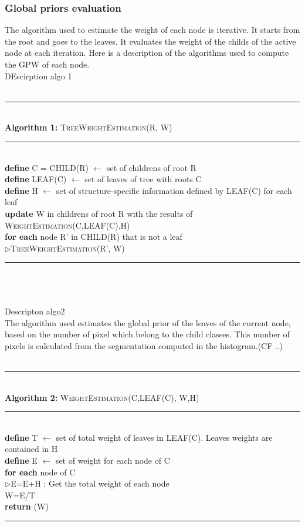 \subsubsection{Global priors evaluation}
The algorithm used to estimate the weight of each node is iterative. It starts from the root and goes to the leaves. It evaluates the weight of the childs of the active node at each iteration. Here is a description of the algorithms used to compute the GPW of each node.\\
DEscirption algo 1\\\\
%
%
\begin{minipage}{1\textwidth}
%
\hrule
\textbf{\\Algorithm 1:} \textsc{TreeWeightEstimation}(R, W)
\hrule
\textbf{\\define}  C = CHILD(R) $\leftarrow$ set of childrens of root R\\ 
\textbf{define}  LEAF(C)      $\leftarrow$ set of leaves of tree with roots C\\ 
\textbf{define}  H            $\leftarrow$ set of structure-specific information defined by LEAF(C) for each leaf\\
%
\textbf{update} W in childrens of root R with the results of \textsc{WeightEstimation}(C,LEAF(C),H)\\
%
\textbf{for each} node R' in CHILD(R) that is not a leaf\\
%
$\triangleright$\textsc{TreeWeightEstimation}(R', W)\\
\hrule
%
\end{minipage}
%
\\\\\\Descripton algo2\\
The algorithm used estimates the global prior of the leaves of the current node, based on the number of pixel which belong to the child classes.
This number of pixels is calculated from the segmentation computed in the histogram.(CF ..)\\\\
%
\begin{minipage}{1\textwidth}
%
\hrule
\textbf{\\Algorithm 2:} \textsc{WeightEstimation}(C,LEAF(C), W,H)
\hrule
\textbf{\\define}  T $\leftarrow$ set of total weight of leaves in LEAF(C). Leaves weights are contained in H\\ 
\textbf{define}  E      $\leftarrow$ set of weight for each node of C\\ 
\textbf{for each}  node of C\\
$\triangleright$E=E+H : Get the total weight of each node\\
%
W=E/T\\
%
\textbf{return} (W)\\
\hrule

\end{minipage}
